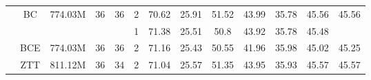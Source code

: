 \begin{table*}[ht]
\begin{tabular}{cc|c|c|c|c|ccccc|c|c}
\multicolumn{1}{c|}{}                                                                         & BC                                            & 774.03M                                           & 36                                                             & 36                                                                & 2                                                              & 70.62                         & 25.91                         & 51.52                         & 43.99                         & 35.78                         & 45.56                         & 45.56                                                    \\ \cline{2-13} 
\multicolumn{1}{c|}{}                                                                         &                                               &                                                   &                                                                &                                                                   & 1                                                              & 71.38                         & 25.51                         & 50.8                          & 43.92                         & 35.78                         & 45.48                         &                                                          \\
\multicolumn{1}{c|}{}                                                                         & \multirow{-2}{*}{BCE}                         & \multirow{-2}{*}{774.03M}                         & \multirow{-2}{*}{36}                                           & \multirow{-2}{*}{36}                                              & 2                                                              & 71.16                         & 25.43                         & 50.55                         & 41.96                         & 35.98                         & 45.02                         & \multirow{-2}{*}{45.25}                                  \\ \cline{2-13} 
\multicolumn{1}{c|}{}                                                                         & ZTT                                            & 811.12M                                           & 36                                                             & 34                                                                & 2                                                              & 71.04                         & 25.57                         & 51.35                         & 43.95                         & 35.93                         & 45.57                         & 45.57                                                    \\ \cline{2-13} 

\end{tabular}
\end{table*}
